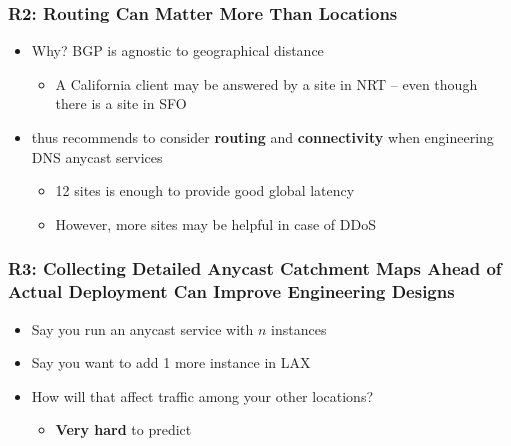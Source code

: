 \documentclass[11pt,show 
notes,notheorems,noamsthm,blank]{beamer} %
\begin{document}
\begin{frame}
 \frametitle{R2: Routing Can Matter More Than Locations}
 
\begin{itemize}
 \item Why? BGP is agnostic to geographical distance
 \begin{itemize}
  \item A California client may be answered by a site in NRT -- even 
though there is a site in SFO
 \end{itemize}

 \item \cite{Schmidt17a} thus recommends to consider \textbf{routing} and 
\textbf{connectivity} 
when engineering DNS anycast services

\begin{itemize}


 \item 12 sites is enough to provide good global latency 
 \item However, more sites may be helpful in case of DDoS~\cite{Moura16b}
\end{itemize}
\end{itemize}

\end{frame}

\begin{frame}
 \frametitle{R3: Collecting Detailed Anycast Catchment Maps Ahead of Actual
    Deployment Can Improve Engineering Designs}
    
    \begin{itemize}
     \item Say you run an anycast service with $n$  instances
     \item  Say you want to add 1 more  instance in LAX
     \item How will that affect traffic among your other locations?
      \begin{itemize}
       \item \textbf{Very hard} to predict
      \end{itemize}

    \end{itemize}

    
\end{frame}
\end{document}
